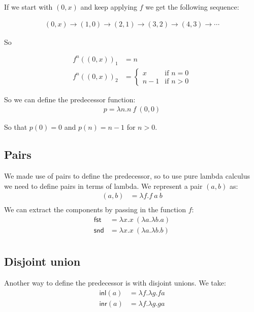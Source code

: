 If we start with $(0,x)$ and keep applying $f$ we get the following sequence:

\begin{align*}
  (0,x) \to (1,0) \to (2,1) \to (3,2) \to (4,3) \to \cdots
\end{align*}

So

\begin{align*}
  f^n((0,x))_1 &= n\\
  f^n((0,x))_2 &= \begin{cases}
    x & \text{if } n=0 \\
    n-1 & \text{if } n > 0
  \end{cases}
\end{align*}

So we can define the predecessor function:
\begin{align*}
  p = \lambda n. n\ f\ (0,0)
\end{align*}

So that $p(0) = 0$ and $p(n) = n-1$ for $n>0$.

\subsection*{Pairs}

We made use of pairs to define the predecessor, so to use pure lambda calculus we need to define pairs in terms of lambda. We represent a pair $(a,b)$ as:
\begin{align*}
  (a,b) &= \lambda f. f\ a\ b \\
\end{align*}
We can extract the components by passing in the function $f$:
\begin{align*}
  \mathsf{fst} &= \lambda x. x\ (\lambda a. \lambda b. a)\\
  \mathsf{snd} &= \lambda x. x\ (\lambda a. \lambda b. b)\\
\end{align*}

\subsection*{Disjoint union}

Another way to define the predecessor is with disjoint unions. We take:
\begin{align*}
  \mathsf{inl}(a) &= \lambda f. \lambda g. f a \\
  \mathsf{inr}(a) &= \lambda f. \lambda g. g a
\end{align*}

